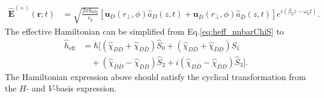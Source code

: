 \documentclass[preprint,aps,pra,onecolumn,superscriptaddress]{revtex4-1} %
\def\br{\mathbf{r}}
\newcommand{\nn}{\nonumber}
\newcommand{\eff}{\text{eff}}
\begin{document}
\begin{appendix}
\begin{align}
\hat{\mathbf{E}}^{(+)}(\br;t) &=\sqrt{ \frac{2 \pi \hbar \omega_0}{ v_g} } \left[\mathbf{u}_D(r\!_\perp,\phi) \hat{a}_D(z,t)+\mathbf{u}_{\bar{D}}(r\!_\perp,\phi) \hat{a}_{\bar{D}}(z,t)  \right]e^{i (\beta_0 z- \omega_0 t)}.
\end{align}
The effective Hamiltonian can be simplified from Eq.\eqref{eq:heff_nnbarChiS} to 
\begin{align}
\hat{h}_\eff &= \hbar[(\hat{\chi}_{DD}+\hat{\chi}_{\bar{D}\bar{D}})\hat{S}_0 +(\hat{\chi}_{D\bar{D}}+\hat{\chi}_{\bar{D}D} )\hat{S}_1\nn\\
&\quad + (\hat{\chi}_{\bar{D}\bar{D}}-\hat{\chi}_{DD})\hat{S}_2 +i(\hat{\chi}_{D\bar{D}}-\hat{\chi}_{\bar{D}D} )\hat{S}_3].
\end{align}
The Hamiltonian expression above should satisfy the cyclical transformation from the $ H $- and $ V $-basis expression.


\end{appendix}
\end{document}
